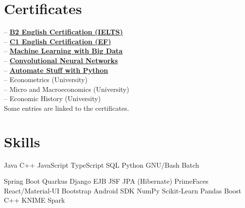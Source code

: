 \documentclass[]{CV-JuanCamiloFlorez}
\begin{document}
\begin{minipage}[t]{0.33\textwidth}
\section{Certificates}
-- \textbf{\href{https://jcamilo.co/IELTS-2022.pdf}{B2 English Certification (IELTS)}} \\
-- \textbf{\href{https://www.efset.org/cert/j8ebfw}{C1 English Certification (EF)}} \\
-- \textbf{\href{https://www.coursera.org/account/accomplishments/certificate/8MS64GGYWDT5?utm_medium=certificate&utm_source=link&utm_campaign=copybutton_certificate}{Machine Learning with Big Data}} \\
-- \textbf{\href{https://www.coursera.org/account/accomplishments/certificate/KFN2XJC2KP92?utm_medium=certificate&utm_source=link&utm_campaign=copybutton_certificate}{Convolutional Neural Networks}} \\
-- \textbf{\href{https://www.udemy.com/certificate/UC-ZHLLMBQA}{Automate Stuff with Python}} \\
-- Econometrics (University) \\
-- Micro and Macroeconomics (University) \\
-- Economic History (University) \\
\smallskip
\scriptsize{Some entries are linked to the certificates.}
\sectionsep


\section{Skills}
    \textbullet{} Java
    \textbullet{} C++
    \textbullet{} JavaScript
    \textbullet{} TypeScript
    \textbullet{} SQL
    \textbullet{} Python
    \textbullet{} GNU/Bash
    \textbullet{} Batch

    \textbullet{} Spring Boot
    \textbullet{} Quarkus
    \textbullet{} Django
    \textbullet{} EJB JSF JPA (Hibernate) PrimeFaces
    \textbullet{} React/Material-UI
    \textbullet{} Bootstrap
    \textbullet{} Android SDK
    \textbullet{} NumPy
    \textbullet{} Scikit-Learn
    \textbullet{} Pandas
    \textbullet{} Boost C++
    \textbullet{} KNIME
    \textbullet{} Spark


\end{minipage}
\end{document}
